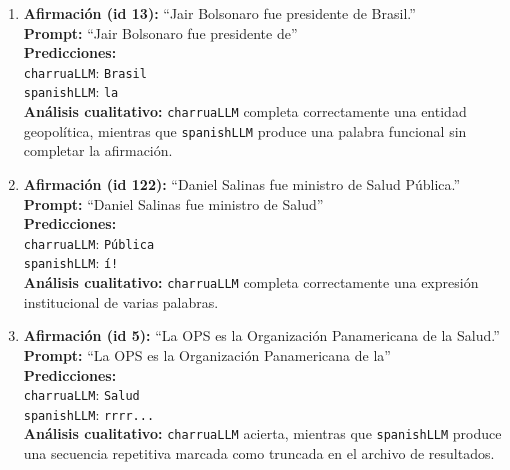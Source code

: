 \documentclass[11pt,a4paper]{article}
\newcommand{\charrua}{\texttt{charruaLLM}}
\newcommand{\spanishmodel}{\texttt{spanishLLM}}
\newcommand{\code}[1]{\texttt{#1}}
\begin{document}
\begin{enumerate}[leftmargin=*, itemsep=0.9em]
    \item \textbf{Afirmación (id 13):} ``Jair Bolsonaro fue presidente de Brasil.''\\
          \textbf{Prompt:} ``Jair Bolsonaro fue presidente de''\\
          \textbf{Predicciones:}\\
          \hspace*{1em}\charrua{}: \code{Brasil}\\
          \hspace*{1em}\spanishmodel{}: \code{la}\\
          \textbf{Análisis cualitativo:} \charrua{} completa correctamente una
          entidad geopolítica, mientras que \spanishmodel{} produce una palabra
          funcional sin completar la afirmación.

    \item \textbf{Afirmación (id 122):} ``Daniel Salinas fue ministro de Salud
          Pública.''\\
          \textbf{Prompt:} ``Daniel Salinas fue ministro de Salud''\\
          \textbf{Predicciones:}\\
          \hspace*{1em}\charrua{}: \code{Pública}\\
          \hspace*{1em}\spanishmodel{}: \code{í!}\\
          \textbf{Análisis cualitativo:} \charrua{} completa correctamente una
          expresión institucional de varias palabras.

    \item \textbf{Afirmación (id 5):} ``La OPS es la Organización Panamericana
          de la Salud.''\\
          \textbf{Prompt:} ``La OPS es la Organización Panamericana de la''\\
          \textbf{Predicciones:}\\
          \hspace*{1em}\charrua{}: \code{Salud}\\
          \hspace*{1em}\spanishmodel{}: \code{rrrr...}\\
          \textbf{Análisis cualitativo:} \charrua{} acierta, mientras que
          \spanishmodel{} produce una secuencia repetitiva marcada como truncada
          en el archivo de resultados.
\end{enumerate}
\end{document}
